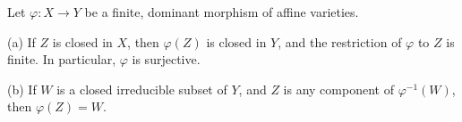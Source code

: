Let $\varphi: X \rightarrow Y$ be a finite, dominant morphism of affine varieties.

(a) If $Z$ is closed in $X$, then $\varphi(Z)$ is closed in $Y$, and the restriction of $\varphi$ to $Z$ is finite. In particular, $\varphi$ is surjective.

(b) If $W$ is a closed irreducible subset of $Y$, and $Z$ is any component of $\varphi^{-1}(W)$, then $\varphi(Z) = W$.
